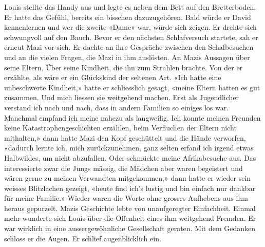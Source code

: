 Louis stellte das Handy aus und legte es neben dem Bett auf den
Bretterboden. Er hatte das Gefühl, bereits ein bisschen dazuzugehören.
Bald würde er David kennenlernen und wer die zweite «Dame» war,
würde sich zeigen. Er drehte sich schwungvoll auf den Bauch. Bevor er
den nächsten Schlafversuch startete, sah er erneut Mazi vor sich.
Er dachte an ihre Gespräche zwischen den Schafbesuchen und
an die vielen Fragen, die Mazi in ihm auslösten. An Mazis Aussagen über
seine Eltern. Über seine Kindheit, die ihn zum Strahlen brachte. Von der
er erzählte, als wäre er ein Glückskind der seltenen Art.
«Ich hatte eine unbeschwerte Kindheit,» hatte er schliesslich gesagt,
«meine Eltern hatten es gut zusammen. Und mich liessen sie weitgehend machen. Erst als Jugendlicher verstand ich
nach und nach, dass in andern Familien so einiges los war. Manchmal
empfand ich meine nahezu als langweilig. Ich konnte meinen
Freunden keine Katastrophengeschichten erzählen, beim Verfluchen der
Eltern nicht mithalten,» dann hatte Mazi den Kopf geschüttelt und die
Hände verworfen, «dadurch lernte ich, mich zurückzunehmen, ganz selten erfand ich
irgend etwas Halbwildes, um nicht abzufallen. Oder schmückte meine
Afrikabesuche aus. Das interessierte zwar die Jungs mässig, die Mädchen
aber waren begeistert und wären gerne zu meinen Verwandten mitgekommen,»
dann hatte er wieder sein weisses Blitzlachen gezeigt, «heute find ich’s
lustig und bin einfach nur dankbar für meine Familie.»
Wieder waren die Worte ohne grosses Aufhebens aus ihm heraus gepurzelt. 
Mazis Geschichte lebte von unaufgeregter Einfachheit. Einmal mehr
wunderte sich Louis über die Offenheit eines ihm weitgehend Fremden. Er
war wirklich in eine aussergewöhnliche Gesellschaft geraten.
Mit dem Gedanken schloss er die Augen. Er schlief augenblicklich ein.

